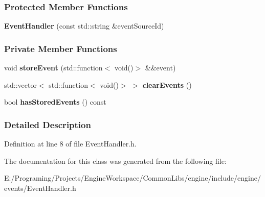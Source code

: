 \subsubsection*{Protected Member Functions}
\begin{DoxyCompactItemize}
\item 
{\bfseries Event\+Handler} (const std\+::string \&event\+Source\+Id)\hypertarget{a00033_a6dc8ff476d89c85b4fca87f50707aa94}{}\label{a00033_a6dc8ff476d89c85b4fca87f50707aa94}

\end{DoxyCompactItemize}
\subsubsection*{Private Member Functions}
\begin{DoxyCompactItemize}
\item 
void {\bfseries store\+Event} (std\+::function$<$ void()$>$ \&\&event)\hypertarget{a00032_a58488602891a7963895ba6f5b50b49ef}{}\label{a00032_a58488602891a7963895ba6f5b50b49ef}

\item 
std\+::vector$<$ std\+::function$<$ void()$>$ $>$ {\bfseries clear\+Events} ()\hypertarget{a00032_ac2d38cbe364ea23cb5919d76ad995407}{}\label{a00032_ac2d38cbe364ea23cb5919d76ad995407}

\item 
bool {\bfseries has\+Stored\+Events} () const \hypertarget{a00032_ad8c3610cafce6f79319b7dd4787b47d6}{}\label{a00032_ad8c3610cafce6f79319b7dd4787b47d6}

\end{DoxyCompactItemize}


\subsubsection{Detailed Description}


Definition at line 8 of file Event\+Handler.\+h.



The documentation for this class was generated from the following file\+:\begin{DoxyCompactItemize}
\item 
E\+:/\+Programing/\+Projects/\+Engine\+Workspace/\+Common\+Libs/engine/include/engine/events/Event\+Handler.\+h\end{DoxyCompactItemize}
